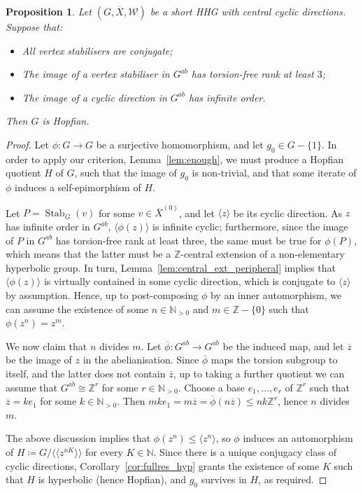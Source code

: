 \documentclass[svgnames]{amsart}
\theoremstyle{plain}
\newtheorem{prop}[thm]{Proposition}
\theoremstyle{definition}
\newcommand{\Z}{\mathbb{Z}}
\newcommand{\ov}[1]{\overline{#1}}
\newcommand{\Stab}[2]{\operatorname{Stab}_{#1}(#2)}
\newcommand{\W}{\mathcal{W}}
\begin{document}
\begin{prop}\label{prop:example_hopf}
    Let $(G, \ov X, \W)$ be a short HHG with central cyclic directions. Suppose that:
    \begin{itemize}
        \item All vertex stabilisers are conjugate;
        \item The image of a vertex stabiliser in $G^{ab}$ has torsion-free rank at least $3$;
        \item The image of a cyclic direction in $G^{ab}$ has infinite order.
    \end{itemize}
    Then $G$ is Hopfian.
\end{prop}

\begin{proof}
     Let $\phi\colon G\to G$ be a surjective homomorphism, and let $g_0\in G-\{1\}$. In order to apply our criterion, Lemma~\ref{lem:enough}, we must produce a Hopfian quotient $H$ of $G$, such that the image of $g_0$ is non-trivial, and that some iterate of $\phi$ induces a self-epimorphism of $H$.
     
     Let $P=\Stab{G}{v}$ for some $v\in \ov X^{(0)}$, and let $\langle z\rangle$ be its cyclic direction. As $z$ has infinite order in $G^{ab}$, $\langle\phi(z)\rangle$ is infinite cyclic; furthermore, since the image of $P$ in $G^{ab}$ has torsion-free rank at least three, the same must be true for $\phi(P)$, which means that the latter must be a $\Z$-central extension of a non-elementary hyperbolic group. In turn, Lemma~\ref{lem:central_ext_peripheral} implies that $\langle\phi(z)\rangle$ is virtually contained in some cyclic direction, which is conjugate to $\langle z\rangle$ by assumption. Hence, up to post-composing $\phi$ by an inner automorphism, we can assume the existence of some $n\in \mathbb{N}_{>0}$ and $m\in \mathbb{Z}-\{0\}$ such that $\phi(z^n)=z^m$. 
     
     We now claim that $n$ divides $m$. Let $\ov\phi\colon G^{ab}\to G^{ab}$ be the induced map, and let $\ov z$ be the image of $z$ in the abelianisation. Since $\ov \phi$ maps the torsion subgroup to itself, and the latter does not contain $\ov z$, up to taking a further quotient we can assume that $G^{ab}\cong \Z^r$ for some $r\in\mathbb{N}_{>0}$. Choose a base $e_1,\ldots, e_r$ of $\Z^r$ such that $\ov z=ke_1$ for some $k\in\mathbb{N}_{>0}$. Then $mke_1=m\ov z=\ov\phi(n\ov z)\le nk \Z^r$, hence $n$ divides $m$.


    The above discussion implies that $\phi(z^n)\le \langle z^n\rangle$, so $\phi$ induces an automorphism of $H\coloneq G/\langle\langle z^{nK}\rangle\rangle$ for every $K\in\mathbb{N}$. Since there is a unique conjugacy class of cyclic directions, Corollary~\ref{cor:fullres_hyp} grants the existence of some $K$ such that $H$ is hyperbolic (hence Hopfian), and $g_0$ survives in $H$, as required. 
\end{proof}
\end{document}
